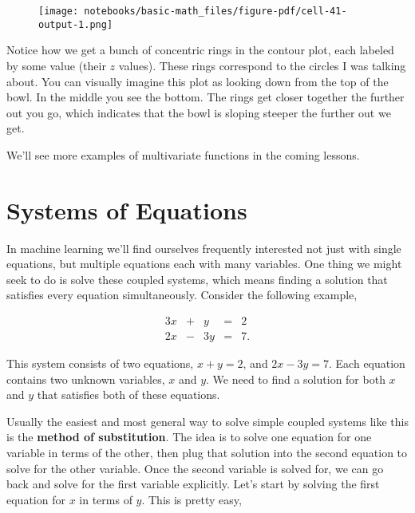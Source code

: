 \documentclass[
  letterpaper,
  DIV=11,
  numbers=noendperiod]{scrreprt}
\begin{document}
\begin{figure}[H]

{\centering \texttt{[image: notebooks/basic-math\_files/figure-pdf/cell-41-output-1.png]}

}

\end{figure}

Notice how we get a bunch of concentric rings in the contour plot, each
labeled by some value (their \(z\) values). These rings correspond to
the circles I was talking about. You can visually imagine this plot as
looking down from the top of the bowl. In the middle you see the bottom.
The rings get closer together the further out you go, which indicates
that the bowl is sloping steeper the further out we get.

We'll see more examples of multivariate functions in the coming lessons.

\hypertarget{systems-of-equations}{%
\section{Systems of Equations}\label{systems-of-equations}}

In machine learning we'll find ourselves frequently interested not just
with single equations, but multiple equations each with many variables.
One thing we might seek to do is solve these coupled systems, which
means finding a solution that satisfies every equation simultaneously.
Consider the following example,

\begin{alignat*}{3}
   x & {}+{} &  y & {}={} & 2  \\
   2x & {}-{} &  3y & {}={} & 7.
\end{alignat*}

This system consists of two equations, \(x + y = 2\), and
\(2x - 3y = 7\). Each equation contains two unknown variables, \(x\) and
\(y\). We need to find a solution for both \(x\) and \(y\) that
satisfies both of these equations.

Usually the easiest and most general way to solve simple coupled systems
like this is the \textbf{method of substitution}. The idea is to solve
one equation for one variable in terms of the other, then plug that
solution into the second equation to solve for the other variable. Once
the second variable is solved for, we can go back and solve for the
first variable explicitly. Let's start by solving the first equation for
\(x\) in terms of \(y\). This is pretty easy,
\end{document}
